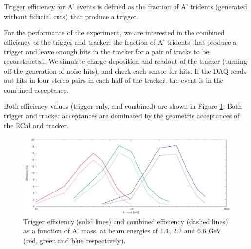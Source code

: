Trigger efficiency for A' events is defined as the fraction of A' tridents (generated without fiducial cuts) that produce a trigger.

For the performance of the experiment, we are interested in the combined efficiency of the trigger and tracker: the fraction of A' tridents that produce a trigger and leave enough hits in the tracker for a pair of tracks to be reconstructed.
We simulate charge deposition and readout of the tracker (turning off the generation of noise hits), and check each sensor for hits. 
If the DAQ reads out hits in four stereo pairs in each half of the tracker, the event is in the combined acceptance.

Both efficiency values (trigger only, and combined) are shown in Figure \ref{fig:trigeff}. 
Both trigger and tracker acceptances are dominated by the geometric acceptances of the ECal and tracker.

\begin{figure}[ht]
	\includegraphics[width=\textwidth]{performance/trigger/ap_eff}
	\caption{\small{Trigger efficiency (solid lines) and combined efficiency (dashed lines) as a function of A' mass, at beam energies of 1.1, 2.2 and 6.6 GeV (red, green and blue respectively).}}
	\label{fig:trigeff}
\end{figure}

